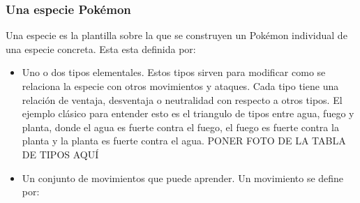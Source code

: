 \subsubsection{Una especie Pokémon}
Una especie es la plantilla sobre la que se construyen un Pokémon individual de una especie concreta. Esta esta definida por:
\begin{itemize}
    \item Uno o dos tipos elementales. Estos tipos sirven para modificar como se relaciona la especie con otros movimientos y ataques. Cada tipo tiene una relación de ventaja, desventaja o neutralidad con respecto a otros tipos. El ejemplo clásico para entender esto es el triangulo de tipos entre agua, fuego y planta, donde el agua es fuerte contra el fuego, el fuego es fuerte contra la planta y la planta es fuerte contra el agua. PONER FOTO DE LA TABLA DE TIPOS AQUÍ
    \item Un conjunto de movimientos que puede aprender. Un movimiento se define por:
    

\end{itemize}
